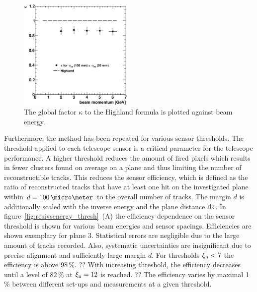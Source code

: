 \begin{figure}[ht!]
  \centering
  \includegraphics[width=0.49\textwidth]{figures/kappa}
  \caption[HL Factor]{
  The global factor $\kappa$ to the Highland formula is plotted against beam energy.
  }
  \label{fig:HL_factor}
\end{figure}

Furthermore, the method has been repeated for various sensor thresholds.
The threshold applied to each telescope sensor is a critical parameter for the telescope performance.
A higher threshold reduces the amount of fired pixels which results in fewer clusters found on average on a plane and thus limiting the number of reconstructible tracks.
This reduces the sensor efficiency, which is defined as the ratio of reconstructed tracks that have at least one hit on the investigated plane within $d = 100\,\micro\meter$ to the overall number of tracks.
The margin $d$ is additionally scaled with the inverse energy and the plane distance $\textrm{d}z$. 
In figure~\ref{fig:resivsenergy_thresh}~(A) the efficiency dependence on the sensor threshold is shown for various beam energies and sensor spacings.
Efficiencies are shown exemplary for plane 3. 
Statistical errors are negligible due to the large amount of tracks recorded.
Also, systematic uncertainties are insignificant due to precise alignment and sufficiently large margin $d$.  
For thresholds $\xi_{\textrm{n}} < 7$ the efficiency is above $98\,\%$. ??
With increasing threshold, the efficiency decreases until a level of $82\,\%$ at $\xi_{\textrm{n}} = 12$ is reached. ??
The efficiency varies by maximal 1\,\% between different set-ups and measurements at a given threshold. 

